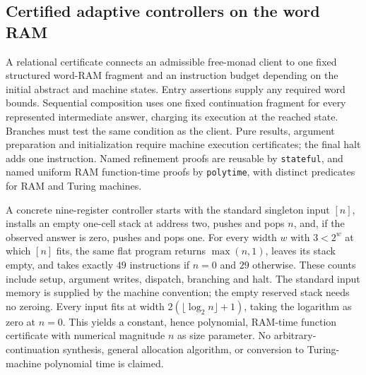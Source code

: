 \begin{result}
\subsection{Certified adaptive controllers on the word RAM}
A relational certificate connects an admissible free-monad client to one fixed structured
word-RAM fragment and an instruction budget depending on the initial abstract and machine
states. Entry assertions supply any required word bounds. Sequential composition uses one fixed
continuation fragment for every represented intermediate answer, charging its execution at the
reached state. Branches must test the same condition as the client. Pure results, argument
preparation and initialization require machine execution certificates; the final halt adds one
instruction. Named refinement proofs are reusable by \texttt{stateful}, and named uniform
RAM function-time proofs by \texttt{polytime}, with distinct predicates for RAM and Turing machines.

A concrete nine-register controller starts with the standard singleton input $[n]$, installs an
empty one-cell stack at address two, pushes and pops $n$, and, if the observed answer is zero,
pushes and pops one. For every width $w$ with $3<2^w$ at which $[n]$ fits, the same flat program
returns $\max(n,1)$, leaves its stack empty, and takes exactly $49$ instructions if $n=0$ and
$29$ otherwise. These counts include setup, argument writes, dispatch, branching and halt.
The standard input memory is supplied by the machine convention; the empty reserved stack
needs no zeroing. Every input fits at width $2(\lfloor\log_2 n\rfloor+1)$, taking the logarithm
as zero at $n=0$. This yields a constant, hence polynomial, RAM-time function certificate with
numerical magnitude $n$ as size parameter. No arbitrary-continuation synthesis, general
allocation algorithm, or conversion to Turing-machine polynomial time is claimed.
\end{result}


